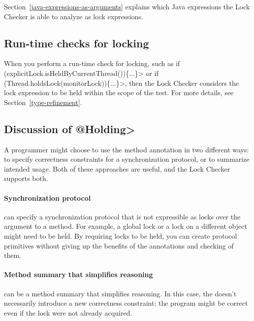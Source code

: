 Section~\ref{java-expressions-as-arguments} explains which Java
expressions the Lock Checker is able to analyze as lock expressions.


\subsection{Run-time checks for locking\label{lock-runtime-checks}}

When you perform a run-time check for locking, such as
\<if (explicitLock.isHeldByCurrentThread())\{...\}> or
\<if (Thread.holdsLock(monitorLock))\{...\}>,
then the Lock Checker considers the lock expression to be held
within the scope of the test.  For more details, see
Section~\ref{type-refinement}.


\subsection{Discussion of \<@Holding>\label{lock-checker-holding}}

A programmer might choose to use the  method annotation in
two different ways:  to specify correctness constraints for a synchronization protocol, or to summarize
intended usage.  Both of these approaches are useful, and the Lock Checker
supports both.

\paragraph{Synchronization protocol\label{lock-checker-holding-synchronization-protocol}}

   can specify a synchronization protocol that
  is not expressible as locks over the argument to a method.  For example, a global lock
  or a lock on a different object might need to be held.  By requiring locks to be
  held, you can create protocol primitives without giving up
  the benefits of the annotations and checking of them.

\paragraph{Method summary that simplifies reasoning\label{lock-checker-holding-method-summary}}

   can be a method summary that simplifies reasoning.  In
  this case, the  doesn't necessarily introduce a new
  correctness constraint; the program might be correct even if the lock
  were not already acquired.

